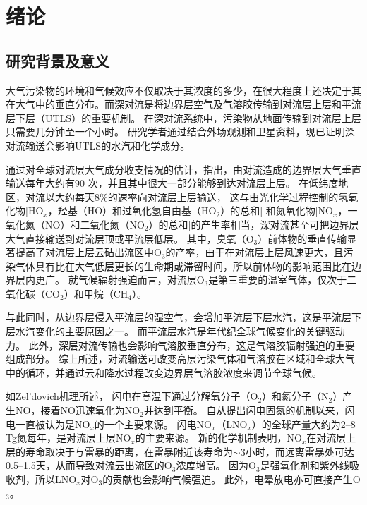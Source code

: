 
\chapter{绪论}

\section{研究背景及意义}

大气污染物的环境和气候效应不仅取决于其浓度的多少，在很大程度上还决定于其在大气中的垂直分布。而深对流是将边界层空气及气溶胶传输到对流层上层和平流层下层（UTLS）的重要机制\citep{Chatfield.1984,Dickerson.1987,Pickering.1989,Yin.2002}。
在深对流系统中，污染物从地面传输到对流层上层只需要几分钟至一个小时\citep{Skamarock.2000}。
研究学者通过结合外场观测\citep{Dickerson.1987,Pickering.1996,Bertram.2007,Apel.2012,Pan.2017}和卫星资料\citep{Halland.2009,Barth.2012,Livesey.2013,Jensen.2015}，现已证明深对流输送会影响UTLS的水汽和化学成分。

通过对全球对流层大气成分收支情况的估计，\citet{Cotton.1995}指出，由对流造成的边界层大气垂直输送每年大约有90 次，并且其中很大一部分能够到达对流层上层。
在低纬度地区，对流以大约每天8\%的速率向对流层上层输送，
这与由光化学过程控制的氢氧化物[HO$_x$，羟基（HO）和过氧化氢自由基（HO$_2$）的总和]
和氮氧化物[NO$_x$，一氧化氮（NO）和二氧化氮（NO$_2$）的总和]的产生率相当，深对流甚至可把边界层大气直接输送到对流层顶或平流层低层\citep{Prather.1997}。
其中，臭氧（O$_3$）前体物的垂直传输显著提高了对流层上层云砧出流区中O$_3$的产率\citep{Pickering.1990,Pickering.1992,Pickering.1992a}，由于在对流层上层风速更大，且污染气体具有比在大气低层更长的生命期或滞留时间，所以前体物的影响范围比在边界层内更广。
就气候辐射强迫而言，对流层O$_3$是第三重要的温室气体\citep{Myhre.2013}，仅次于二氧化碳（CO$_2$）和甲烷（CH$_4$）。

与此同时，从边界层侵入平流层的湿空气，会增加平流层下层水汽\citep{Homeyer.2014}，这是平流层下层水汽变化的主要原因之一。
而平流层水汽是年代纪全球气候变化的关键驱动力\citep{Solomon.2010}。 此外，深层对流传输也会影响气溶胶垂直分布，这是气溶胶辐射强迫的重要组成部分\citep{Mishra.2012,Park.2015}。
综上所述，对流输送可改变高层污染气体和气溶胶在区域和全球大气中的循环\citep{Clarisse.2011}，并通过云和降水过程改变边界层气溶胶浓度来调节全球气候\citep{Taylor.1997}。

如Zel'dovich机理所述\citep{Zeldovich.1967}，
闪电在高温下通过分解氧分子（O$_2$）和氮分子（N$_2$）产生NO，接着NO迅速氧化为NO$_2$并达到平衡。
自从\citet{Liebig.1827}提出闪电固氮的机制以来，闪电一直被认为是NO$_x$的一个主要来源\citep{Hutchinson.1954}。
闪电NO$_x$（LNO$_x$）的全球产量大约为2–8 Tg氮每年，是对流层上层NO$_x$的主要来源\citep{Galloway.2004,Schumann.2007}。
新的化学机制表明，NO$_x$在对流层上层的寿命取决于与雷暴的距离，在雷暴附近该寿命为$\sim$3小时，而远离雷暴处可达0.5--1.5天\citep{Nault.2016,Nault.2017}，从而导致对流云出流区的O$_3$浓度增高\citep{Pickering.1996,Hauglustaine.2001,DeCaria.2005}。
因为O$_3$是强氧化剂和紫外线吸收剂\citep{Myhre.2013}，所以LNO$_x$对O$_3$的贡献也会影响气候强迫。
此外，电晕放电亦可直接产生O$_3$\citep{Minschwaner.2008,Kotsakis.2017}。

